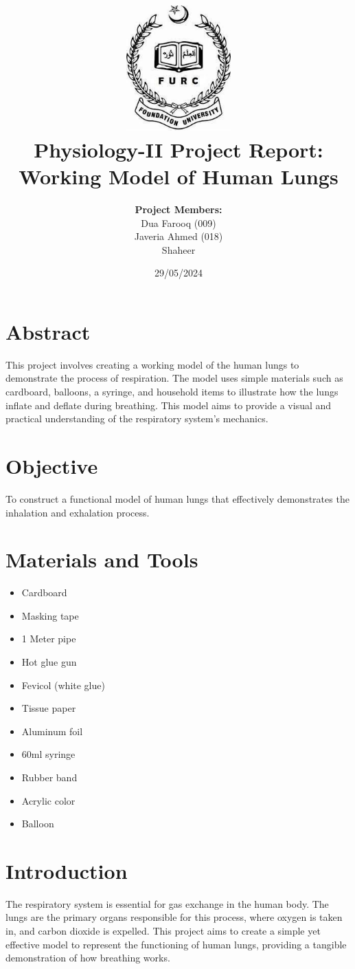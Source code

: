 \documentclass[12pt]{article}
\title{
    \vspace{-2cm}
    \includegraphics[width=0.3\textwidth]{logo.png}\\ %
    \vspace{1cm}
    \textbf{Physiology-II Project Report:}\\
    \textbf{Working Model of Human Lungs}
}
\author{
    \textbf{Project Members:} \\
    Dua Farooq (009) \\
    Javeria Ahmed (018) \\
    Shaheer
}
\date{29/05/2024}
\begin{document}
\maketitle
\newpage

\tableofcontents
\newpage

\section*{Abstract}
This project involves creating a working model of the human lungs to demonstrate the process of respiration. The model uses simple materials such as cardboard, balloons, a syringe, and household items to illustrate how the lungs inflate and deflate during breathing. This model aims to provide a visual and practical understanding of the respiratory system’s mechanics.

\section{Objective}
To construct a functional model of human lungs that effectively demonstrates the inhalation and exhalation process.

\section{Materials and Tools}
\begin{itemize}
    \item Cardboard
    \item Masking tape
    \item 1 Meter pipe
    \item Hot glue gun
    \item Fevicol (white glue)
    \item Tissue paper
    \item Aluminum foil
    \item 60ml syringe
    \item Rubber band
    \item Acrylic color
    \item Balloon
\end{itemize}

\section{Introduction}
The respiratory system is essential for gas exchange in the human body. The lungs are the primary organs responsible for this process, where oxygen is taken in, and carbon dioxide is expelled. This project aims to create a simple yet effective model to represent the functioning of human lungs, providing a tangible demonstration of how breathing works.
\end{document}

